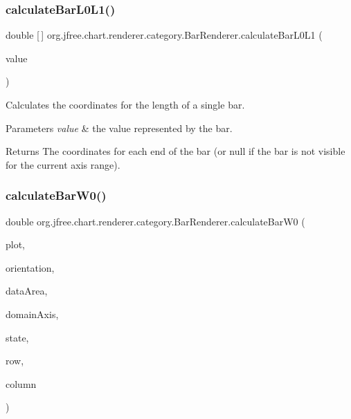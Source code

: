 \subsubsection{\texorpdfstring{calculate\+Bar\+L0\+L1()}{calculateBarL0L1()}}
{\footnotesize\ttfamily double \mbox{[}$\,$\mbox{]} org.\+jfree.\+chart.\+renderer.\+category.\+Bar\+Renderer.\+calculate\+Bar\+L0\+L1 (\begin{DoxyParamCaption}\item[{double}]{value }\end{DoxyParamCaption})\hspace{0.3cm}{\ttfamily [protected]}}

Calculates the coordinates for the length of a single bar.


\begin{DoxyParams}{Parameters}
{\em value} & the value represented by the bar.\\
\hline
\end{DoxyParams}
\begin{DoxyReturn}{Returns}
The coordinates for each end of the bar (or {\ttfamily null} if the bar is not visible for the current axis range). 
\end{DoxyReturn}
\mbox{\label{classorg_1_1jfree_1_1chart_1_1renderer_1_1category_1_1_bar_renderer_ac71de09da9576b58bfa64a73c9d1623b}} 
\subsubsection{\texorpdfstring{calculate\+Bar\+W0()}{calculateBarW0()}}
{\footnotesize\ttfamily double org.\+jfree.\+chart.\+renderer.\+category.\+Bar\+Renderer.\+calculate\+Bar\+W0 (\begin{DoxyParamCaption}\item[{\mbox{\hyperlink{classorg_1_1jfree_1_1chart_1_1plot_1_1_category_plot}{Category\+Plot}}}]{plot,  }\item[{\mbox{\hyperlink{classorg_1_1jfree_1_1chart_1_1plot_1_1_plot_orientation}{Plot\+Orientation}}}]{orientation,  }\item[{Rectangle2D}]{data\+Area,  }\item[{\mbox{\hyperlink{classorg_1_1jfree_1_1chart_1_1axis_1_1_category_axis}{Category\+Axis}}}]{domain\+Axis,  }\item[{\mbox{\hyperlink{classorg_1_1jfree_1_1chart_1_1renderer_1_1category_1_1_category_item_renderer_state}{Category\+Item\+Renderer\+State}}}]{state,  }\item[{int}]{row,  }\item[{int}]{column }\end{DoxyParamCaption})\hspace{0.3cm}{\ttfamily [protected]}}

